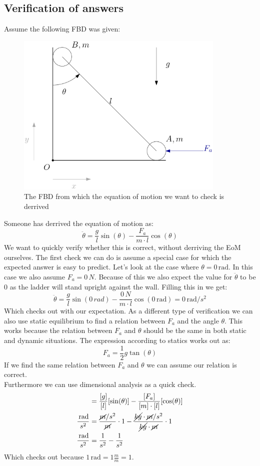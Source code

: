 \documentclass[11pt, a4paper]{article}
\newcommand*{\rad}{\ensuremath{\,\text{rad}}}
\begin{document}
\subsection{Verification of answers}
Assume the following FBD was given:
\begin{figure}[h]
  \centerline{\includegraphics[width=100mm]{images/Sliding_rod.png}}
  \caption{The FBD from which the equation of motion we want to check is derrived}
\end{figure}
Someone has derrived the equation of motion as:
\begin{equation*}
  \ddot{\theta} = \frac{g}{l}\sin(\theta) - \frac{F_a}{m\cdot l}\cos(\theta)
\end{equation*}
We want to quickly verify whether this is correct, without derriving the EoM ourselves. The first check we can do is assume a special case for which the expected answer is easy to predict. Let's look at the case where $\theta = 0\rad$. In this case we also assume $F_a = 0\,N$. Because of this we also expect the value for $\ddot{\theta}$ to be $0$ as the ladder will stand upright against the wall. Filling this in we get:
\begin{equation*}
  \ddot{\theta} = \frac{g}{l}\sin(0\,rad) - \frac{0\,N}{m\cdot l}\cos(0\rad) = 0\rad/s^2
\end{equation*}
Which checks out with our expectation. As a different type of verification we can also use static equilibrium to find a relation between $F_a$ and the angle $\theta$. This works because the relation between $F_a$ and $\theta$ should be the same in both static and dynamic situations. The expression according to statics works out as:
\begin{equation*}
  F_a = \frac{1}{2}g\tan(\theta)
\end{equation*}
If we find the same relation between $F_a$ and $\theta$ we can assume our relation is correct.\\
Furthermore we can use dimensional analysis as a quick check.
\begin{align*}
  [\ddot{\theta}]  &= \frac{[g]}{[l]}[\sin(\theta)] - \frac{[F_a]}{[m]\cdot [l]}[\cos(\theta)]\\
  \frac{\rad}{s^2} &= \frac{\cancel{m}/s^2}{\cancel{m}} \cdot 1 - \frac{\cancel{kg}\cdot \cancel{m}/s^2}{\cancel{kg}\cdot \cancel{m}} \cdot 1\\
  \frac{\rad}{s^2} &= \frac{1}{s^2} - \frac{1}{s^2}
\end{align*}
Which checks out because $1\rad = 1 \frac{m}{m} = 1$.
\end{document}
